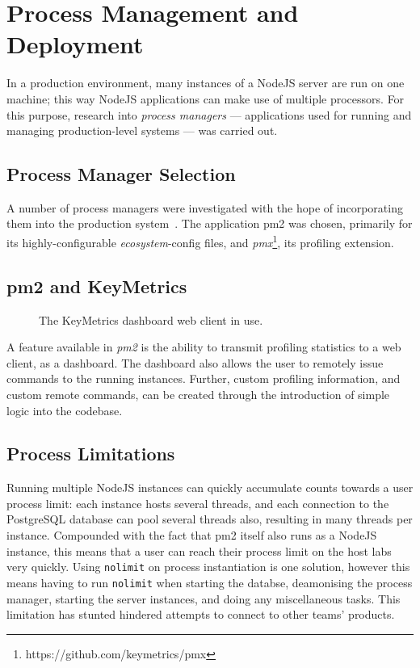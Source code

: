 \section{Process Management and Deployment}\label{sec:pm}
In a production environment, many instances of a NodeJS server are run on
one machine; this way NodeJS applications can make use of multiple
processors. For this purpose, research into \emph{process managers} ---
applications used for running and managing production-level systems ---
was carried out.

\subsection{Process Manager Selection}\label{sec:pms}
A number of process managers were investigated with the hope of
incorporating them into the production
system~\cite{strongloop}\cite{pm2}\cite{forever}. The application pm2 was
chosen, primarily for its highly-configurable \emph{ecosystem}-config files,
and \emph{pmx}\footnote{https://github.com/keymetrics/pmx},
its profiling extension.

\subsection{pm2 and KeyMetrics}\label{sec:pm2}

\begin{figure}
	\centering
	\caption{The KeyMetrics dashboard web client in use.}\label{fig:dash}
\end{figure}

A feature available in \emph{pm2} is the ability to transmit profiling
statistics to a web client, as a dashboard. The dashboard also allows the
user to remotely issue commands to the running instances. Further,
custom profiling information, and custom remote commands, can be created
through the introduction of simple logic into the codebase.

\subsection{Process Limitations}\label{sec:plim}
Running multiple NodeJS instances can quickly accumulate counts towards a
user process limit: each instance hosts several threads, and each connection
to the PostgreSQL database can pool several threads also, resulting in many
threads per instance. Compounded with the fact that pm2 itself also runs
as a NodeJS instance, this means that a user can reach their process limit
on the host labs very quickly. Using \texttt{nolimit} on process
instantiation is one solution, however this means having to run
\texttt{nolimit} when starting the databse, deamonising the process manager,
starting the server instances, and doing any miscellaneous tasks. This
limitation has stunted hindered attempts to connect to other teams'
products.

